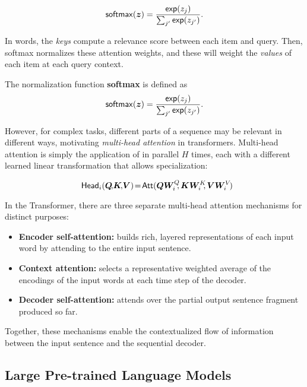 \begin{equation}
  \operatorname*{\mathsf{softmax}}(\bm{z}) = \frac{\operatorname*{\mathsf{exp}}(z_j)}{\sum_{j'} \operatorname*{\mathsf{exp}}(z_{j'})}.
\end{equation}

In words, the \emph{keys} compute a relevance score between each item
and query. Then, softmax normalizes these attention weights, and
these will weight the \emph{values} of each item at each query
context.

\begin{definition}
  The normalization function \textbf{softmax} is defined as
  \begin{equation}\label{eq:softmax}
    \operatorname*{\mathsf{softmax}}(\bm{z}) = \frac{\operatorname*{\mathsf{exp}}(z_j)}{\sum_{j'} \operatorname*{\mathsf{exp}}(z_{j'})}.
  \end{equation}
\end{definition}

However, for complex tasks, different parts of a sequence may be
relevant in different ways, motivating \emph{multi-head attention} in
transformers. Multi-head attention is simply the application of
 in parallel $H$ times, each with a
different learned linear transformation that allows specialization:

\begin{equation}\label{eq:head}%
  \hspace{-.01ex}%
  \ath_i(\bm{Q}\!,\!\bm{K}\!,\!\bm{V})\!=\!\att(\bm{QW}_i^Q\!\!,\bm{KW}_i^K\!\!,\bm{VW}_i^V\!)%
  \hspace{-1.5ex}%
\end{equation}

In the Transformer, there are three separate multi-head attention mechanisms for
distinct purposes:
\begin{itemize}
  \item \textbf{Encoder self-attention:} builds rich, layered representations of
        each input word by attending to the entire input sentence.
  \item \textbf{Context attention:} selects
        a representative weighted average of the encodings of the input words at each
        time step of the decoder.
  \item \textbf{Decoder self-attention:} attends over the partial output sentence
        fragment produced so far.
\end{itemize}
Together, these mechanisms enable the contextualized flow of information between
the input sentence and the sequential decoder.

\subsection{Large Pre-trained Language Models}

